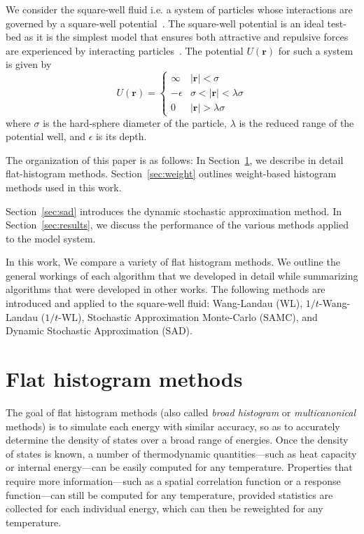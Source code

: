 \documentclass[letterpaper,twocolumn,amsmath,amssymb,pre,aps,10pt]{revtex4-1}
\begin{document}
We consider the square-well fluid i.e. a system of particles whose
interactions are governed by a square-well
potential~\cite{singh2003surface, barker2004perturbationSW}.  The
square-well potential is an ideal test-bed as it is the simplest model
that ensures both attractive and repulsive forces are experienced by
interacting particles~\cite{barker1967-SW-perturbation, vega1992phase}.
The potential $U(\textbf{r})$ for such a system is given by
\begin{equation}
 U(\textbf{r})=\begin{cases} \infty &
 \lvert\textbf{r}\rvert< \sigma\\-\epsilon &
 \sigma<\lvert\textbf{r}\rvert<\lambda\sigma\\0 &
 \lvert\textbf{r}\rvert > \lambda\sigma\end{cases}
\end{equation}
where $\sigma$ is the hard-sphere diameter of the particle, $\lambda$ is the
reduced range of the potential well, and $\epsilon$ is its depth.

The organization of this paper is as follows: In Section~\ref{sec:histogram}, we
describe in detail flat-histogram methods.  Section~\ref{sec:weight} outlines
weight-based histogram methods used in this work.

Section~\ref{sec:sad} introduces the dynamic stochastic approximation method.
In Section~\ref{sec:results}, we discuss the performance of the various methods
applied to the model system.

In this work, We compare a variety of flat histogram
methods.  We outline the general workings of each algorithm that we
developed in detail while summarizing algorithms that were developed in other
works.  The following methods are introduced and applied to the
square-well fluid: Wang-Landau (WL), $1/t$-Wang-Landau ($1/t$-WL), Stochastic
Approximation Monte-Carlo (SAMC), and Dynamic Stochastic Approximation (SAD).

\section{Flat histogram methods}\label{sec:histogram}

The goal of flat histogram methods (also called \emph{broad histogram}
or \emph{multicanonical} methods) is to simulate each energy with
similar accuracy, so as to accurately determine the density of states
over a broad range of energies.  Once the density of states is known,
a number of thermodynamic quantities---such as heat capacity or
internal energy---can be easily computed for any temperature.
Properties that require more information---such as a spatial
correlation function or a response function---can still be computed
for any temperature, provided statistics are collected for each
individual energy, which can then be reweighted for any temperature.
\end{document}
